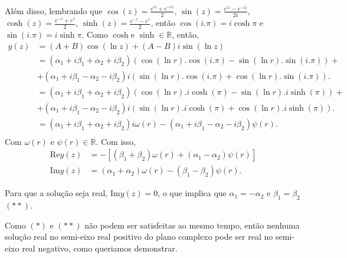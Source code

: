 \documentclass[a4paper,12pt, leqno, answers]{exam}
\begin{document}
\begin{questions}
\begin{solution}
       Além disso, lembrando que $\cos\left(z\right) = \frac{e^{iz}+e^{-iz}}{2}$, $\sin\left(z\right) = \frac{e^{iz}-e^{-iz}}{2i}$, $\cosh\left(z\right) = \frac{e^{-z}+e^{z}}{2}$, $\sinh\left(z\right) = \frac{e^{-z}-e^{z}}{2}$, então $\cos\left(i.\pi\right) = i\cosh \pi$ e $\sin\left(i.\pi\right) = i\sinh \pi$. Como $\cosh \text{e } \sinh \in \mathbb{R}$, então,  
        \begin{align*}
         y(z) &= \left( A + B \right) \cos\left( \ln z \right) + \left( A - B \right) i \sin \left( \ln z \right) \\
            &= \left( \alpha_1 + i \beta_1 + \alpha_2 + i\beta_2 \right)\left( \cos\left(\ln r\right).\cos\left(i.\pi\right) - \sin\left(\ln r\right).\sin\left(i.\pi\right)\right) +\\
            &+ \left( \alpha_1 + i \beta_1 - \alpha_2 - i\beta_2 \right) i\left( \sin\left(\ln r\right).\cos\left(i.\pi\right) + \cos\left(\ln r\right).\sin\left(i.\pi \right)\right). \\
          &= \left( \alpha_1 + i \beta_1 + \alpha_2 + i\beta_2 \right)\left( \cos\left(\ln r\right).i\cosh\left(\pi\right) - \sin\left(\ln r\right).i\sinh\left(\pi\right)\right) +\\
            &+ \left( \alpha_1 + i \beta_1 - \alpha_2 - i\beta_2 \right) i\left( \sin\left(\ln r\right).i\cosh\left(\pi\right) + \cos\left(\ln r\right).i\sinh\left(\pi \right)\right). \\
          &= \left( \alpha_1 + i \beta_1 + \alpha_2 + i\beta_2 \right)i \omega\left(r \right) - \left( \alpha_1 + i \beta_1 - \alpha_2 - i\beta_2 \right)  \psi\left(r \right). \\
        \end{align*}        
        Com $\omega\left(r\right) \text{ e } \psi\left(r\right) \in \mathbb{R}$. Com isso,
        \begin{align*}
            \text{Re}y\left( z \right) &= -\left[\left(\beta_1 + \beta_2 \right)\omega \left(r\right) + \left(\alpha_1 - \alpha_2\right)\psi \left(r\right)\right]\\
            \text{Im}y\left( z \right) &= \left(\alpha_1 + \alpha_2\right)\omega \left(r\right) - \left(\beta_1 - \beta_2\right)\psi \left(r\right).
        \end{align*}
        
      Para que a solu\c cão seja real, $\text{Im} y\left(z\right) = 0$, o que implica que $\alpha_1 = - \alpha_2$ e $\beta_1 = \beta_2$ $\left(**\right)$. 
      
      Como $\left(*\right)$ e $\left(**\right)$ não podem ser satisfeitas ao mesmo tempo, então nenhuma solu\c cão real no semi-eixo real positivo do plano complexo pode ser real no semi-eixo real negativo, como queriamos demonstrar.
    \end{solution}


\end{questions}
\end{document}
